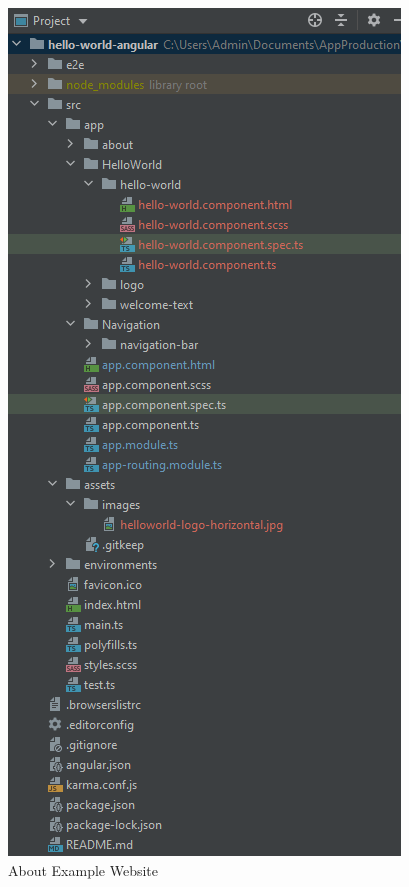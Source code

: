 \begin{figure}
	\includegraphics[width=0.9\linewidth]{./images/SamplePage_ProjectStructure}
	\caption{About Example Website}
	\label{fig:aboutexamplepage}
\end{figure}
\newline
